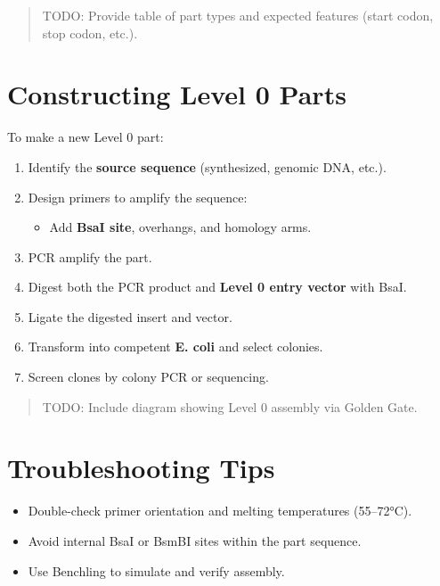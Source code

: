 \documentclass[
  letterpaper,
  DIV=11,
  numbers=noendperiod]{scrreprt}
\providecommand{\tightlist}{%
  \setlength{\itemsep}{0pt}\setlength{\parskip}{0pt}}\usepackage{longtable,booktabs,array}
\begin{document}
\begin{quote}
TODO: Provide table of part types and expected features (start codon,
stop codon, etc.).
\end{quote}

\section{Constructing Level 0 Parts}\label{constructing-level-0-parts}

To make a new Level 0 part:

\begin{enumerate}
\def\labelenumi{\arabic{enumi}.}
\tightlist
\item
  Identify the \textbf{source sequence} (synthesized, genomic DNA,
  etc.).
\item
  Design primers to amplify the sequence:

  \begin{itemize}
  \tightlist
  \item
    Add \textbf{BsaI site}, overhangs, and homology arms.
  \end{itemize}
\item
  PCR amplify the part.
\item
  Digest both the PCR product and \textbf{Level 0 entry vector} with
  BsaI.
\item
  Ligate the digested insert and vector.
\item
  Transform into competent \textbf{E. coli} and select colonies.
\item
  Screen clones by colony PCR or sequencing.
\end{enumerate}

\begin{quote}
TODO: Include diagram showing Level 0 assembly via Golden Gate.
\end{quote}

\section{Troubleshooting Tips}\label{troubleshooting-tips}

\begin{itemize}
\tightlist
\item
  Double-check primer orientation and melting temperatures (55--72°C).
\item
  Avoid internal BsaI or BsmBI sites within the part sequence.
\item
  Use Benchling to simulate and verify assembly.
\end{itemize}
\end{document}
